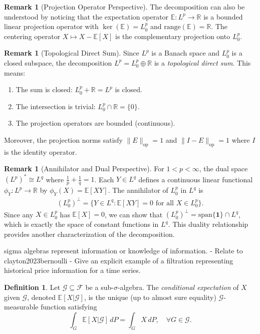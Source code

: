 \documentclass[11pt,reqno]{amsart}
\theoremstyle{definition}
\newtheorem{definition}[theorem]{Definition}
\newtheorem{remark}[theorem]{Remark}
\theoremstyle{remark}
\begin{document}
\begin{remark}[Projection Operator Perspective]
	The decomposition can also be understood by noticing that the expectation operator \(\mathbb{E}: L^p \to \mathbb{R}\) is a bounded linear projection operator with \(\ker(\mathbb{E}) = L^p_0\) and \(\text{range}(\mathbb{E}) = \mathbb{R}\). The centering operator \(X \mapsto X - \mathbb{E}[X]\) is the complementary projection onto \(L^p_0\).
\end{remark}

\begin{remark}[Topological Direct Sum]
	Since \(L^p\) is a Banach space and \(L^p_0\) is a closed subspace, the decomposition \(L^p = L^p_0 \oplus \mathbb{R}\) is a \emph{topological direct sum}. This means:
	\begin{enumerate}[label=(\roman*)]
		\item The sum is closed: \(L^p_0 + \mathbb{R} = L^p\) is closed.
		\item The intersection is trivial: \(L^p_0 \cap \mathbb{R} = \{0\}\).
		\item The projection operators are bounded (continuous).
	\end{enumerate}
	Moreover, the projection norms satisfy $\|E\|_{\text{op}} = 1$ and $\|I - E\|_{\text{op}} = 1$ where $I$ is the identity operator.
\end{remark}

\begin{remark}[Annihilator and Dual Perspective]
	For $1 < p < \infty$, the dual space $(L^p)^* \cong L^q$ where $\frac{1}{p} + \frac{1}{q} = 1$. Each $Y \in L^q$ defines a continuous linear functional $\phi_Y: L^p \to \mathbb{R}$ by $\phi_Y(X) = \mathbb{E}[XY]$. The annihilator of $L^p_0$ in $L^q$ is
	\begin{align*}
		(L^p_0)^\perp = \{Y \in L^q : \mathbb{E}[XY] = 0 \text{ for all } X \in L^p_0\}.
	\end{align*}
	Since any $X \in L^p_0$ has $\mathbb{E}[X] = 0$, we can show that $(L^p_0)^\perp = \text{span}\{\mathbf{1}\} \cap L^q$, which is exactly the space of constant functions in $L^q$. This duality relationship provides another characterization of the decomposition.
\end{remark}


sigma algebras represent information or knowledge of information.
- Relate to clayton2023bernoulli
- Give an explicit example of a filtration representing historical price information for a time series.

\begin{definition}
	Let $\mathcal{G} \subseteq \mathcal{F}$ be a sub-$\sigma$-algebra. The \emph{conditional expectation} of $X$ given $\mathcal{G}$, denoted $\mathbb{E}[X|\mathcal{G}]$, is the unique (up to almost sure equality) $\mathcal{G}$-measurable function satisfying
	\[
		\int_G \mathbb{E}[X|\mathcal{G}] \, dP = \int_G X \, dP, \quad \forall G \in \mathcal{G}.
	\]
\end{definition}
\end{document}
